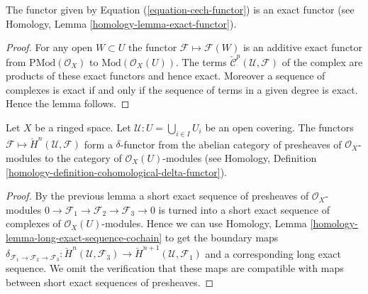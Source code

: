 \begin{lemma}
\label{lemma-cech-exact-presheaves}
The functor given by Equation (\ref{equation-cech-functor})
is an exact functor (see Homology, Lemma \ref{homology-lemma-exact-functor}).
\end{lemma}

\begin{proof}
For any open $W \subset U$ the functor
$\mathcal{F} \mapsto \mathcal{F}(W)$ is an additive exact functor
from $\text{PMod}(\mathcal{O}_X)$ to $\text{Mod}(\mathcal{O}_X(U))$.
The terms
$\check{\mathcal{C}}^p(\mathcal{U}, \mathcal{F})$
of the complex are products of these exact functors and hence exact.
Moreover a sequence of complexes is exact if and only if the sequence
of terms in a given degree is exact. Hence the lemma follows.
\end{proof}

\begin{lemma}
\label{lemma-cech-cohomology-delta-functor-presheaves}
Let $X$ be a ringed space.
Let $\mathcal{U} : U = \bigcup_{i \in I} U_i$ be an open covering.
The functors $\mathcal{F} \mapsto \check{H}^n(\mathcal{U}, \mathcal{F})$
form a $\delta$-functor from the abelian category of
presheaves of $\mathcal{O}_X$-modules to the category
of $\mathcal{O}_X(U)$-modules (see
Homology, Definition \ref{homology-definition-cohomological-delta-functor}).
\end{lemma}

\begin{proof}
By the previous lemma a short exact sequence of presheaves of
$\mathcal{O}_X$-modules
$0 \to \mathcal{F}_1 \to \mathcal{F}_2 \to \mathcal{F}_3 \to 0$
is turned into a short exact sequence of complexes of
$\mathcal{O}_X(U)$-modules. Hence we can use
Homology, Lemma \ref{homology-lemma-long-exact-sequence-cochain}
to get the boundary maps
$\delta_{\mathcal{F}_1 \to \mathcal{F}_2 \to \mathcal{F}_3} :
\check{H}^n(\mathcal{U}, \mathcal{F}_3) \to 
\check{H}^{n + 1}(\mathcal{U}, \mathcal{F}_1)$
and a corresponding long exact sequence. We omit the verification
that these maps are compatible with maps between short exact
sequences of presheaves.
\end{proof}


